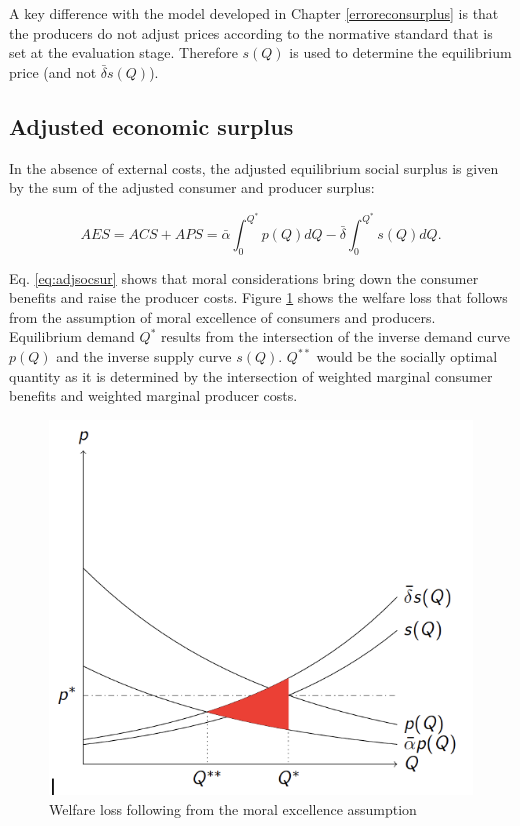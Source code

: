 \documentclass[
]{book}
\begin{document}
A key difference with the model developed in Chapter \ref{erroreconsurplus} is that the producers do not adjust prices according to the normative standard that is set at the evaluation stage. Therefore \(s(Q)\) is used to determine the equilibrium price (and not \(\bar{\delta}s(Q)\)).

\hypertarget{adjusted-economic-surplus}{%
\subsection{Adjusted economic surplus}\label{adjusted-economic-surplus}}

In the absence of external costs, the adjusted equilibrium social surplus is given by the sum of the adjusted consumer and producer surplus:

\begin{equation}
  AES = ACS + APS = \bar{\alpha} \int_0^{Q^*} p(Q)dQ - \bar{\delta} \int_0^{Q^*} s(Q) dQ.
  \label{eq:adjsocsur}
\end{equation}

Eq. \eqref{eq:adjsocsur} shows that moral considerations bring down the consumer benefits and raise the producer costs. Figure \ref{fig:moralloss} shows the welfare loss that follows from the assumption of moral excellence of consumers and producers. Equilibrium demand \(Q^*\) results from the intersection of the inverse demand curve \(p(Q)\) and the inverse supply curve \(s(Q)\). \(Q^{**}\) would be the socially optimal quantity as it is determined by the intersection of weighted marginal consumer benefits and weighted marginal producer costs.

\begin{figure}
\includegraphics[width=7.5in]{./figures/moralloss} \caption{Welfare loss following from the moral excellence assumption}\label{fig:moralloss}
\end{figure}
\end{document}

